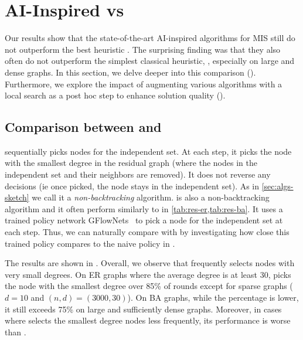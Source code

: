 \section{AI-Inspired vs  \deggreedy}\label{sec:ablations}
Our results show that the state-of-the-art AI-inspired algorithms for MIS still do not outperform the best heuristic \redumis. The surprising finding was that they also often do not outperform the  simplest classical heuristic, \deggreedy, especially on large and dense graphs. In this section, we  delve deeper into this comparison (). Furthermore, we explore the impact of augmenting various algorithms with a local search as a post hoc step to enhance solution quality ().

\subsection{Comparison between \deggreedy and \gflownets}\label{sec:comp-gflownets}



\deggreedy sequentially picks nodes for the independent set.  At each step, it picks the node  with the smallest degree in the residual graph (where the nodes in the independent set and their neighbors are removed).  It does not reverse any decisions (ie once picked, the node stays in the independent set).  As in \cref{sec:algs-sketch} we call it a \emph{non-backtracking} algorithm. \gflownets is also a non-backtracking algorithm and it often perform similarly to \deggreedy in \cref{tab:res-er,tab:res-ba}. It uses a trained policy network GFlowNets~\citep{bengio2021flow} to pick a node for the independent set at each step. Thus, we can naturally compare \gflownets with \deggreedy by investigating how close this trained policy compares to the naive policy in \deggreedy.

The results are shown in . Overall, we observe that \gflownets frequently selects nodes with very small degrees. On ER graphs where the average degree is at least 30, \gflownets picks the node with the smallest degree over 85\% of rounds except for sparse graphs ($d=10$ and $(n,d)=(3000,30)$). On BA graphs, while the percentage is lower, it still exceeds 75\% on large and sufficiently dense graphs. Moreover, in cases where \gflownets selects the smallest degree nodes less frequently, its performance is worse than \deggreedy.

